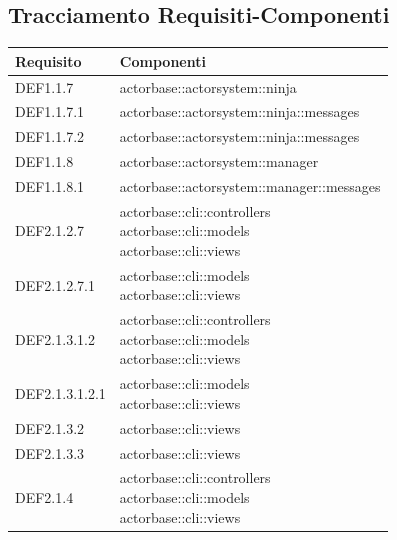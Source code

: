 \documentclass{scalatekids-article}
\begin{document}
\subsection{Tracciamento Requisiti-Componenti}

\begin{longtable}[H]{|p{3.5cm}|p{7.5cm}|}
\hline
\textbf{Requisito} & \textbf{Componenti}\\
\hline
DEF1.1.7 & \multiLineCell[t]{actorbase::actorsystem::ninja\\}\\
\hline
DEF1.1.7.1 & \multiLineCell[t]{actorbase::actorsystem::ninja::messages\\}\\
\hline
DEF1.1.7.2 & \multiLineCell[t]{actorbase::actorsystem::ninja::messages\\}\\
\hline
DEF1.1.8 & \multiLineCell[t]{actorbase::actorsystem::manager\\}\\
\hline
DEF1.1.8.1 & \multiLineCell[t]{actorbase::actorsystem::manager::messages\\}\\
\hline
DEF2.1.2.7 & \multiLineCell[t]{actorbase::cli::controllers\\actorbase::cli::models\\actorbase::cli::views\\}\\
\hline
DEF2.1.2.7.1 & \multiLineCell[t]{actorbase::cli::models\\actorbase::cli::views\\}\\
\hline
DEF2.1.3.1.2 & \multiLineCell[t]{actorbase::cli::controllers\\actorbase::cli::models\\actorbase::cli::views\\}\\
\hline
DEF2.1.3.1.2.1 & \multiLineCell[t]{actorbase::cli::models\\actorbase::cli::views\\}\\
\hline
DEF2.1.3.2 & \multiLineCell[t]{actorbase::cli::views\\}\\
\hline
DEF2.1.3.3 & \multiLineCell[t]{actorbase::cli::views\\}\\
\hline
DEF2.1.4 & \multiLineCell[t]{actorbase::cli::controllers\\actorbase::cli::models\\actorbase::cli::views\\}\\

\end{longtable}
\end{document}
